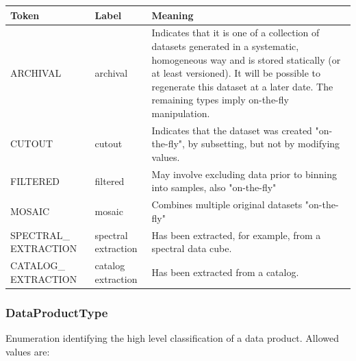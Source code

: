   \begin{table}[h!]
    \small
    \centering
    \renewcommand{\arraystretch}{1.5}
    \begin{tabular}{|p{1.0in}|p{0.75in}|p{3.5in}|}
      \hline 
           \textbf{Token} & \textbf{Label} & \textbf{Meaning}\\
      \hline  
      \hline  
      ARCHIVAL  & archival & Indicates that it is one of a collection of datasets generated in a systematic, homogeneous way and is stored statically (or at least versioned). It will be possible to regenerate this dataset at a later date. The remaining types imply on-the-fly manipulation. \\
      \hline  
      CUTOUT    & cutout   & Indicates that the dataset was created "on-the-fly", by subsetting, but not by modifying values. \\
      \hline  
      FILTERED  & filtered & May involve excluding data prior to binning into samples, also "on-the-fly" \\
      \hline  
      MOSAIC    & mosaic   & Combines multiple original datasets "on-the-fly" \\
      \hline  
      SPECTRAL\_ EXTRACTION & spectral extraction & Has been extracted, for example, from a spectral data cube. \\
      \hline  
      CATALOG\_ EXTRACTION  & catalog extraction  & Has been extracted from a catalog. \\
      \hline 
    \end{tabular}
  \end{table}

  
  \pagebreak
  \subsubsection{DataProductType}
  \label{sect:product}
  Enumeration identifying the high level classification of a data product. Allowed values are:

